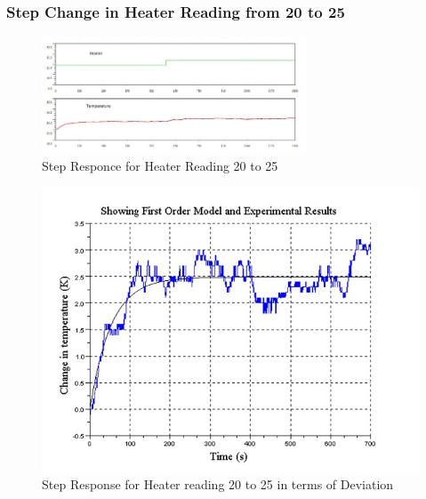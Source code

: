 \newpage
\subsubsection{Step Change in Heater Reading from 20 to 25}
\begin{figure}[h]
\centering
	\includegraphics[width = 0.7\textwidth]{Vikas_self/report_tex/parameter_estimation/20to25.jpg}
		\caption{Step Responce for Heater Reading 20 to 25}
	\label{fig:20to25}
\end{figure}
%
\begin{figure}[h]
\centering
	\includegraphics[width = .7\textwidth]{Vikas_self/report_tex/parameter_estimation/optimized20to25.jpg}
		\caption{Step Response for Heater reading 20 to 25 in terms of Deviation}
	\label{optimized20to25}
\end{figure}
\newpage
